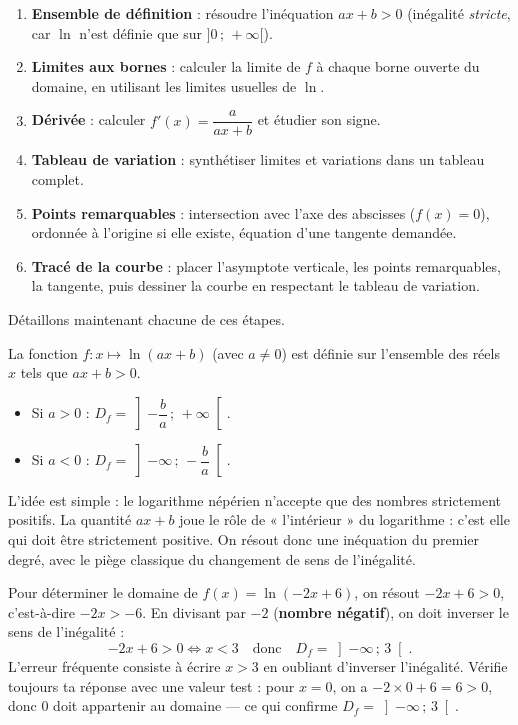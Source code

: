 \documentclass[11pt]{article}
\newcommand{\cle}[1]{{\popxbold\color{popdark}#1}}
\newcounter{popsec}
\newcounter{popsub}
\newcommand{\courssub}[1]{%
  \stepcounter{popsub}%
  \par\vspace{9pt}\noindent{\popxbold\fontsize{11.5}{13}\selectfont\color{popink}{\color{poporange}\thepopsec.\thepopsub}\hspace{6pt}#1}\par\nopagebreak\vspace{4pt}
}
\begin{document}
\begin{methode}[Plan d'étude d'une fonction du type $f(x) = \ln(ax+b)$]
\begin{enumerate}
\item \textbf{Ensemble de définition} : résoudre l'inéquation $ax + b > 0$ (inégalité \emph{stricte}, car $\ln$ n'est définie que sur $]0\,;\,+\infty[$).
\item \textbf{Limites aux bornes} : calculer la limite de $f$ à chaque borne ouverte du domaine, en utilisant les limites usuelles de $\ln$.
\item \textbf{Dérivée} : calculer $f'(x) = \dfrac{a}{ax+b}$ et étudier son signe.
\item \textbf{Tableau de variation} : synthétiser limites et variations dans un tableau complet.
\item \textbf{Points remarquables} : intersection avec l'axe des abscisses ($f(x)=0$), ordonnée à l'origine si elle existe, équation d'une tangente demandée.
\item \textbf{Tracé de la courbe} : placer l'asymptote verticale, les points remarquables, la tangente, puis dessiner la courbe en respectant le tableau de variation.
\end{enumerate}
\end{methode}

Détaillons maintenant chacune de ces étapes.

\courssub{Étape 1 : l'ensemble de définition}

\begin{propriete}
La fonction $f : x \mapsto \ln(ax+b)$ (avec $a \neq 0$) est définie sur l'ensemble des réels $x$ tels que $ax + b > 0$.
\begin{itemize}
\item Si $a > 0$ : $D_f = \left]-\dfrac{b}{a}\,;\,+\infty\right[$.
\item Si $a < 0$ : $D_f = \left]-\infty\,;\,-\dfrac{b}{a}\right[$.
\end{itemize}
\end{propriete}

L'idée est simple : le logarithme népérien n'accepte que des nombres \cle{strictement positifs}. La quantité $ax+b$ joue le rôle de « l'intérieur » du logarithme : c'est elle qui doit être strictement positive. On résout donc une inéquation du premier degré, avec le piège classique du changement de sens de l'inégalité.

\begin{attention}
Pour déterminer le domaine de $f(x) = \ln(-2x+6)$, on résout $-2x + 6 > 0$, c'est-à-dire $-2x > -6$. En divisant par $-2$ (\textbf{nombre négatif}), on doit \cle{inverser le sens de l'inégalité} :
\[ -2x + 6 > 0 \iff x < 3 \quad \text{donc} \quad D_f = \left]-\infty\,;\,3\right[. \]
L'erreur fréquente consiste à écrire $x > 3$ en oubliant d'inverser l'inégalité. Vérifie toujours ta réponse avec une valeur test : pour $x = 0$, on a $-2\times 0 + 6 = 6 > 0$, donc $0$ doit appartenir au domaine — ce qui confirme $D_f = \left]-\infty\,;\,3\right[$.
\end{attention}
\end{document}
